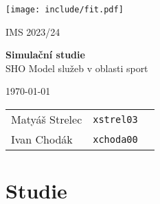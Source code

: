 \documentclass[11pt,a4paper]{article}
\begin{document}
\begin{titlepage}
	\begin{center}
		\texttt{[image: include/fit.pdf]} \\
		
		\vspace{3cm}

  		\Large{
			IMS 2023/24 \\
		}

      \vspace{3cm}
    
		\Huge{
			\textbf{
				Simulační studie} \\
    }
		\vspace{0.5cm}
        \huge {
        SHO Model služeb v oblasti sport
        }

        \vspace{3cm}
                                
		\Large{}
		\today{}
				
		\vspace{2cm}
  
		\begin{tabular}{l l l}
            Matyáš Strelec & \texttt{xstrel03} \\
			Ivan Chodák     & \texttt{xchoda00}  \\
		\end{tabular}
	\end{center}
    \normalsize{}
 \end{titlepage}

\pagebreak{}

\tableofcontents

\pagebreak{}

\section{Studie}
\end{document}
